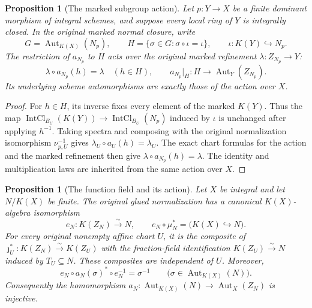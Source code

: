 \documentclass[11pt]{article}
\newtheorem{proposition}[theorem]{Proposition}
\theoremstyle{definition}
\theoremstyle{remark}
\begin{document}
\begin{proposition}[The marked subgroup action]
\label{prop:normalization-marked-action}
Let \(p:Y\to X\) be a finite dominant morphism of integral schemes,
and suppose every local ring of \(Y\) is integrally closed. In the
original marked normal closure, write
\[
 G=\operatorname{Aut}_{K(X)}(N_p),\qquad
 H=\{\sigma\in G:\sigma\circ\iota=\iota\},
 \qquad \iota:K(Y)\hookrightarrow N_p.
\]
The restriction of \(a_{N_p}\) to \(H\) acts over the original marked
refinement \(\lambda:Z_{N_p}\to Y\):
\[
 \lambda\circ a_{N_p}(h)=\lambda\quad(h\in H),\qquad
 a_{N_p}|_H:H\longrightarrow\operatorname{Aut}_Y(Z_{N_p}).
\]
Its underlying scheme automorphisms are exactly those of the action
over \(X\).
\end{proposition}

\begin{proof}
For \(h\in H\), its inverse fixes every element of the marked
\(K(Y)\). Thus the map
\(\operatorname{IntCl}_{B_U}(K(Y))\to\operatorname{IntCl}_{B_U}(N_p)\)
induced by \(\iota\) is unchanged after applying \(h^{-1}\).
Taking spectra and composing with the original normalization
isomorphism \(\nu_{p,U}^{-1}\) gives
\(\lambda_U\circ a_U(h)=\lambda_U\).
The exact chart formulas for the action and the marked refinement
then give \(\lambda\circ a_{N_p}(h)=\lambda\). The identity and
multiplication laws are inherited from the same action over \(X\).
\end{proof}

\begin{proposition}[The function field and its action]
\label{prop:normalization-function-field-comparison}
Let \(X\) be integral and let \(N/K(X)\) be finite. The original glued
normalization has a canonical \(K(X)\)-algebra isomorphism
\[
 e_N:K(Z_N)\xrightarrow{\sim}N,
 \qquad e_N\circ\mu_N^*=\bigl(K(X)\hookrightarrow N\bigr).
\]
For every original nonempty affine chart \(U\), it is the composite of
\(\jmath_U^*:K(Z_N)\xrightarrow{\sim}K(Z_U)\) with the fraction-field
identification \(K(Z_U)\xrightarrow{\sim}N\) induced by \(T_U\subseteq N\).
These composites are independent of \(U\). Moreover,
\[
 e_N\circ a_N(\sigma)^*\circ e_N^{-1}=\sigma^{-1}
 \qquad\bigl(\sigma\in\operatorname{Aut}_{K(X)}(N)\bigr).
\]
Consequently the homomorphism
\(a_N:\operatorname{Aut}_{K(X)}(N)\to\operatorname{Aut}_X(Z_N)\)
is injective.
\end{proposition}
\end{document}
